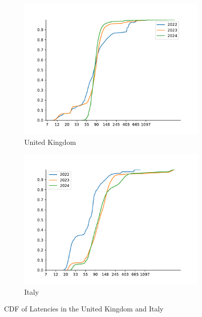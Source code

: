 \begin{figure}
	\centering
	\begin{subfigure}[b]{0.8\linewidth}
		\includegraphics[width=\linewidth]{chapters/4-results/latency/img/cdf_latencies_of_starlink_probes_in_united_kingdom.pdf}
		\caption{United Kingdom}
	\end{subfigure}
	\begin{subfigure}[b]{0.8\linewidth}
		\includegraphics[width=\linewidth]{chapters/4-results/latency/img/cdf_latencies_of_starlink_probes_in_italy.pdf}
		\caption{Italy}
	\end{subfigure}
	\caption{CDF of Latencies in the United Kingdom and
		Italy}
	\label{fig:latency-cdf-3}
\end{figure}

